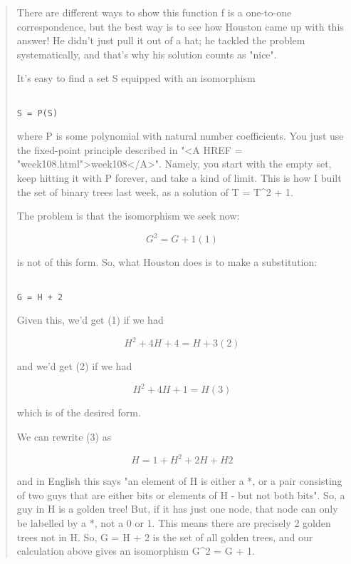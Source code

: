 \begin{quote}
There are different ways to show this function f is a one-to-one correspondence,
but the best way is to see how Houston came up with this answer!  He 
didn't just pull it out of a hat; he tackled the problem 
systematically, and that's
why his solution counts as "nice".

It's easy to find a set S equipped with an isomorphism


\begin{verbatim}

S = P(S)
\end{verbatim}
    
where P is some polynomial with natural number coefficients.  You
just use the fixed-point principle described in "<A HREF = "week108.html">week108</A>".  Namely, 
you start with the empty set, keep hitting it with P forever, and take 
a kind of limit.  This is how I built the set of binary trees last week, 
as a solution of T = T^{2} + 1.   

The problem is that the isomorphism we seek now:


$$

G^{2} = G + 1                               (1)
$$
    
is not of this form.  So, what Houston does is to make a substitution:


\begin{verbatim}

G = H + 2
\end{verbatim}
    
Given this, we'd get (1) if we had


$$

H^{2} + 4H + 4 = H + 3                      (2)
$$
    
and we'd get (2) if we had


$$

H^{2} + 4H + 1 = H                          (3)
$$
    
which is of the desired form.  

We can rewrite (3) as


$$

H = 1 + H^{2} + 2H + H2
$$
    
and in English this says "an element of H is either a *, or
a pair consisting of two guys that are either bits or elements 
of H - but not both bits".  So, a guy in H is a golden tree! 
But, if it has just one node, that node can only be labelled
by a *, not a 0 or 1.  This means there are precisely 2 golden trees
not in H.  So, G = H + 2 is the set of all golden trees, and our
calculation above gives an isomorphism G^{2} = G + 1.


\end{quote}
